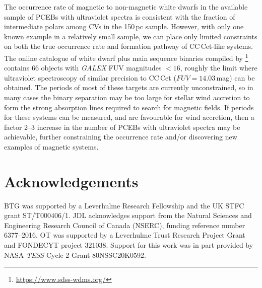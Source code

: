 \documentclass[fleqn,usenatbib]{mnras}
\begin{document}







The occurrence rate of magnetic to non-magnetic white dwarfs in the available sample of PCEBs with ultraviolet spectra is consistent with the fraction of intermediate polars among CVs in the 150\,pc sample. However, with only one known example in a relatively small sample, we can place only limited constraints on both the true occurrence rate and formation pathway of CC\,Cet-like
systems. The online catalogue of white dwarf plus main sequence binaries compiled by \citet{rebassa-mansergasetal12-1}\footnote{\url{https://www.sdss-wdms.org/}} contains 66 objects with \textit{GALEX} FUV magnitudes $<16$, roughly the limit where ultraviolet spectroscopy of similar precision to CC\,Cet ($FUV=14.03$\,mag) can be obtained. The periods of most of these targets are currently unconstrained, so in many cases the binary separation may be too large for stellar wind accretion to form the strong absorption lines required to search for magnetic fields. If periods for these systems can be measured, and are favourable for wind accretion, then a factor 2--3 increase in the number of PCEBs with ultraviolet spectra may be achievable, further constraining the occurrence rate and/or discovering new examples of magnetic systems.       





\section*{Acknowledgements}
BTG was supported by a Leverhulme Research Fellowship and the UK STFC grant ST/T000406/1. JDL acknowledges support from the Natural Sciences and Engineering Research Council of Canada (NSERC), funding reference number 6377--2016. OT was supported by a Leverhulme Trust Research Project Grant and FONDECYT project 321038. Support for this work was in part provided by NASA {\em TESS} Cycle 2 Grant 80NSSC20K0592.
\end{document}
